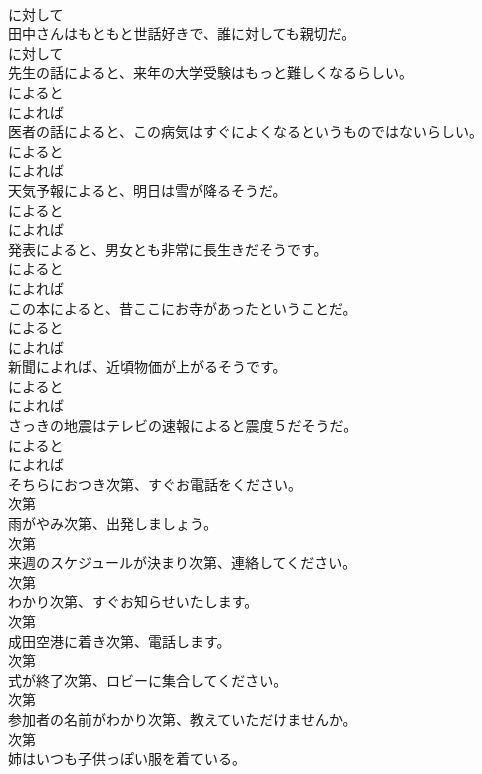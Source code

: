 \documentclass[8pt]{extreport}
\begin{document}
\begin{CJK}{UTF8}{min}
\\	に対して
\\	田中さんはもともと世話好きで、誰に対しても親切だ。	
\\	に対して
\\	先生の話によると、来年の大学受験はもっと難しくなるらしい。	
\\	によると 
\\	によれば
\\	医者の話によると、この病気はすぐによくなるというものではないらしい。	
\\	によると 
\\	によれば
\\	天気予報によると、明日は雪が降るそうだ。	
\\	によると 
\\	によれば
\\	発表によると、男女とも非常に長生きだそうです。	
\\	によると 
\\	によれば
\\	この本によると、昔ここにお寺があったということだ。	
\\	によると 
\\	によれば
\\	新聞によれば、近頃物価が上がるそうです。	
\\	によると 
\\	によれば
\\	さっきの地震はテレビの速報によると震度５だそうだ。	
\\	によると 
\\	によれば
\\	そちらにおつき次第、すぐお電話をください。	
\\	次第
\\	雨がやみ次第、出発しましょう。	
\\	次第
\\	来週のスケジュールが決まり次第、連絡してください。	
\\	次第
\\	わかり次第、すぐお知らせいたします。	
\\	次第
\\	成田空港に着き次第、電話します。	
\\	次第
\\	式が終了次第、ロビーに集合してください。	
\\	次第
\\	参加者の名前がわかり次第、教えていただけませんか。	
\\	次第
\\	姉はいつも子供っぽい服を着ている。	

\end{CJK}
\end{document}
